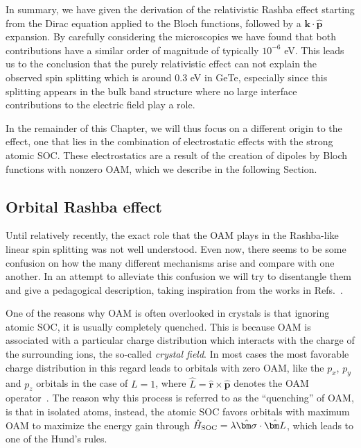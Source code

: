 In summary, we have given the derivation of the relativistic Rashba effect starting from the Dirac equation applied to the Bloch functions, followed by a $\bm k \cdot \hat{\bm p}$ expansion.
By carefully considering the microscopics we have found that both contributions have a similar order of magnitude of typically $10^{-6}$ eV.
This leads us to the conclusion that the purely relativistic effect can not explain the observed spin splitting which is around 0.3 eV in GeTe, especially since this splitting appears in the bulk band structure where no large interface contributions to the electric field play a role.

In the remainder of this Chapter, we will thus focus on a different origin to the effect, one that lies in the combination of electrostatic effects with the strong atomic \gls{SOC}.
These electrostatics are a result of the creation of dipoles by Bloch functions with nonzero \gls{OAM}, which we describe in the following Section. 
\subsection{Orbital Rashba effect}
Until relatively recently, the exact role that the \gls{OAM} plays in the Rashba-like linear spin splitting was not well understood. Even now, there seems to be some confusion on how the many different mechanisms arise and compare with one another.   
In an attempt to alleviate this confusion we will try to disentangle them and give a pedagogical description, taking inspiration from the works in Refs.~\cite{Petersen2000,Park2011,Park2012,Kim2014,Park2015,Go2016}.
    
One of the reasons why \gls{OAM} is often overlooked in crystals is that ignoring atomic \gls{SOC}, it is usually completely quenched.
This is because \gls{OAM} is associated with a particular charge distribution which interacts with the charge of the surrounding ions, the so-called {\it crystal field}.
In most cases the most favorable charge distribution in this regard leads to orbitals with zero \gls{OAM}, like the $p_x$, $p_y$ and $p_z$ orbitals in the case of $L=1$, where $\hat{L} = \hat{\bm r} \times \hat{\bm p}$ denotes the \gls{OAM} operator~\cite{Ballhausen}.
The reason why this process is referred to as the ``quenching'' of \gls{OAM}, is that in isolated atoms, instead, the atomic \gls{SOC} favors orbitals with maximum \gls{OAM} to maximize the energy gain through $\hat{H}_{\rm SOC} = \lambda \hat{\bm \sigma} \cdot \hat{\bm L}$, which leads to one of the Hund's rules.
    
